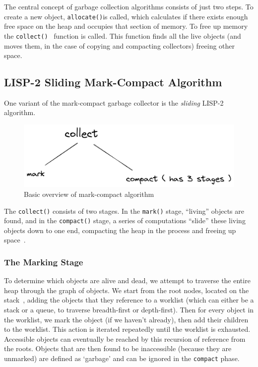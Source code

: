 \documentclass[index]{subfiles}
\begin{document}
The central concept of garbage collection algorithms consists of just two steps. To create a new object, \verb+allocate()+is called, which calculates if there exists enough free space on the heap and occupies that section of memory. To free up memory the \verb+collect()+~\parencite{gc_handbook} function is called. This function finds all the live objects (and moves them, in the case of copying and compacting collectors) freeing other space. 

\subsection{LISP-2 Sliding Mark-Compact Algorithm}

One variant of the mark-compact garbage collector is the \textit{sliding} LISP-2 algorithm.

\begin{figure}[H]
    \centering
    \includegraphics[scale=0.3]{pics/mark-compact-overview.png}
    \caption{Basic overview of mark-compact algorithm}
\end{figure}

The \verb+collect()+ consists of two stages. In the \verb+mark()+ stage, ``living'' objects are found, and in the \verb+compact()+ stage, a series of computations ``slide'' these living objects down to one end, compacting the heap in the process and freeing up space~\parencite[Chapter~3]{gc_handbook}.

\subsubsection{The Marking Stage}

To determine which objects are alive and dead, we attempt to traverse the entire heap through the graph of objects. We start from the root nodes, located on the stack~\parencites[Ch~3~Marking]{redhat_openjdk}[Chapter~3]{gc_handbook}, adding the objects that they reference to a worklist (which can either be a stack or a queue, to traverse breadth-first or depth-first). Then for every object in the worklist, we mark the object (if we haven't already), then add their children to the worklist. This action is iterated repeatedly until the worklist is exhausted. Accessible objects can eventually be reached by this recursion of reference from the roots. Objects that are then found to be inaccessible (because they are unmarked) are defined as `garbage' and can be ignored in the \verb+compact+ phase.
\end{document}

